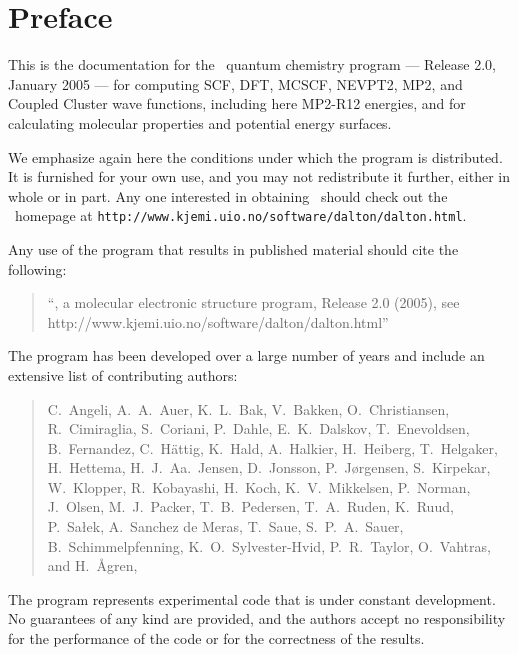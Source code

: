 \tableofcontents

\chapter*{Preface}

This is the documentation for the \dalton\ quantum chemistry program
--- Release 2.0, January 2005 --- for computing SCF, DFT, 
MCSCF, NEVPT2,  MP2, and Coupled Cluster wave functions, including here MP2-R12 energies, and for calculating 
molecular properties and potential energy surfaces.

          We emphasize again here the conditions under which the
program is distributed.  It is furnished for your own use,
and you may not redistribute it further, either in whole or in
part.  Any one interested in obtaining \dalton\ should check out the
\dalton\ homepage at
\verb|http://www.kjemi.uio.no/software/dalton/dalton.html|.

Any use of the program that results in published
material should cite the following:
\begin{quote}
``\dalton , a molecular electronic  structure program, Release
2.0 (2005), see http://www.kjemi.uio.no/software/dalton/dalton.html''
\end{quote}

The program has been developed over a large number of years and
include an extensive list of contributing authors:

\begin{quote}
C.~Angeli,
A.~A.~Auer,
K.~L.~Bak,
V.~Bakken,
O.~Christiansen,
R.~Cimiraglia,
S.~Coriani,
P.~Dahle,
E.~K.~Dalskov,
T.~Enevoldsen,
B.~Fernandez,
C.~H{\"a}ttig,
K.~Hald,
A.~Halkier,
H.~Heiberg,
T.~Helgaker,
H.~Hettema,
H.~J.~Aa.~Jensen,
D.~Jonsson,
P.~J{\o}rgensen,
S.~Kirpekar,
W.~Klopper,
R.~Kobayashi,
H.~Koch,
K.~V.~Mikkelsen,
P.~Norman,
J.~Olsen,
M.~J.~Packer,
T.~B.~Pedersen,
T.~A.~Ruden,
K.~Ruud,
P.~Sa\l ek,
A.~Sanchez de Meras,
T.~Saue,
S.~P.~A.~Sauer,
B.~Schimmelpfenning,
K.~O.~Sylvester-Hvid,
P.~R.~Taylor,
O.~Vahtras,
and H.~{\AA}gren,
\end{quote}

          The program represents experimental code that is
under constant development.  No guarantees of any kind are
provided, and the authors accept no responsibility for the
performance of the code or for the correctness of the results.
